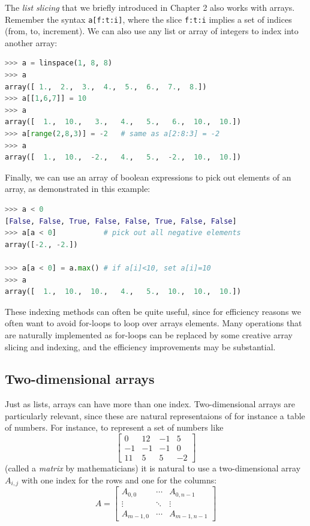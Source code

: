 \documentclass[graybox,envcountchap,sectrefs,final]{svmonodo}
\begin{document}
The \emph{list slicing} that we briefly introduced in Chapter 2 also works with arrays. Remember the syntax
\texttt{a[f:t:i]}, where the slice \texttt{f:t:i} implies a set of indices (from, to, increment). We can also use any list or
array of integers to index into another array:
\begin{lstlisting}[language=Python,style=blue1]
>>> a = linspace(1, 8, 8)
>>> a
array([ 1.,  2.,  3.,  4.,  5.,  6.,  7.,  8.])
>>> a[[1,6,7]] = 10
>>> a
array([  1.,  10.,   3.,   4.,   5.,   6.,  10.,  10.])
>>> a[range(2,8,3)] = -2   # same as a[2:8:3] = -2
>>> a
array([  1.,  10.,  -2.,   4.,   5.,  -2.,  10.,  10.])
\end{lstlisting}
Finally, we can use an array of boolean expressions to pick out elements of an array, as demonstrated in this
example:
\begin{lstlisting}[language=Python,style=blue1]
>>> a < 0
[False, False, True, False, False, True, False, False]
>>> a[a < 0]           # pick out all negative elements
array([-2., -2.])

>>> a[a < 0] = a.max() # if a[i]<10, set a[i]=10
>>> a
array([  1.,  10.,  10.,   4.,   5.,  10.,  10.,  10.])
\end{lstlisting}
These indexing methods can often be quite useful, since for efficiency reasons we often want to avoid for-loops to loop
over arrays elements. Many operations that are naturally implemented as for-loops can be replaced by some creative array
slicing and indexing, and the efficiency improvements may be substantial.

\subsection{Two-dimensional arrays}
Just as lists, arrays can have more than one index. Two-dimensional arrays are particularly relevant, since these
are natural representaions of for instance a table of numbers. For instance, to represent a set of numbers like
\[
\left\lbrack\begin{array}{cccc}
0 & 12 & -1 & 5\\ 
-1 & -1 & -1 & 0\\ 
11 & 5 & 5 & -2
\end{array}\right\rbrack
\]
(called a \emph{matrix} by mathematicians) it is natural to use a two-dimensional array $A_{i,j}$ with one index for the
rows and one for the columns:
\[
A =
\left\lbrack\begin{array}{ccc}
A_{0,0} & \cdots &  A_{0,n-1}\\ 
\vdots & \ddots &  \vdots\\ 
A_{m-1,0} & \cdots & A_{m-1,n-1}
\end{array}\right\rbrack
\]
\end{document}
